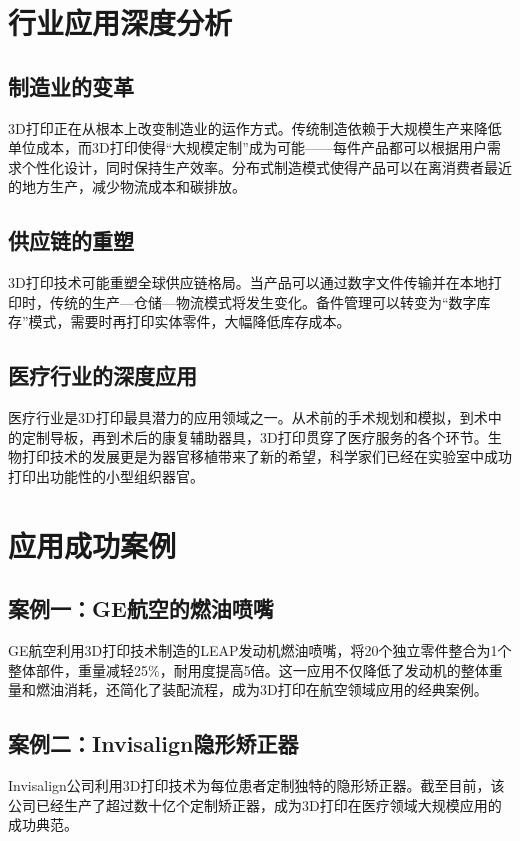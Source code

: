 \documentclass[12pt,UTF8]{ctexbook}
\begin{document}
\section{行业应用深度分析}

\subsection{制造业的变革}
3D打印正在从根本上改变制造业的运作方式。传统制造依赖于大规模生产来降低单位成本，而3D打印使得“大规模定制”成为可能——每件产品都可以根据用户需求个性化设计，同时保持生产效率。分布式制造模式使得产品可以在离消费者最近的地方生产，减少物流成本和碳排放。

\subsection{供应链的重塑}
3D打印技术可能重塑全球供应链格局。当产品可以通过数字文件传输并在本地打印时，传统的生产—仓储—物流模式将发生变化。备件管理可以转变为“数字库存”模式，需要时再打印实体零件，大幅降低库存成本。

\subsection{医疗行业的深度应用}
医疗行业是3D打印最具潜力的应用领域之一。从术前的手术规划和模拟，到术中的定制导板，再到术后的康复辅助器具，3D打印贯穿了医疗服务的各个环节。生物打印技术的发展更是为器官移植带来了新的希望，科学家们已经在实验室中成功打印出功能性的小型组织器官。

\section{应用成功案例}

\subsection{案例一：GE航空的燃油喷嘴}
GE航空利用3D打印技术制造的LEAP发动机燃油喷嘴，将20个独立零件整合为1个整体部件，重量减轻25\%，耐用度提高5倍。这一应用不仅降低了发动机的整体重量和燃油消耗，还简化了装配流程，成为3D打印在航空领域应用的经典案例。

\subsection{案例二：Invisalign隐形矫正器}
Invisalign公司利用3D打印技术为每位患者定制独特的隐形矫正器。截至目前，该公司已经生产了超过数十亿个定制矫正器，成为3D打印在医疗领域大规模应用的成功典范。
\end{document}
